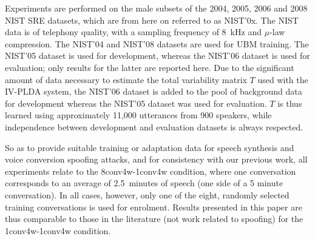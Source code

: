
Experiments are performed on the male subsets of the 2004, 2005, 2006 and 2008 NIST SRE datasets, which are from here on referred to as NIST'0x.  The NIST data is of telephony quality, with a sampling frequency of 8~kHz and $\mu$-law compression.
The NIST'04 and NIST'08 datasets are used for UBM training.
The NIST'05 dataset is used for development, whereas the NIST'06 dataset is used for evaluation;  
only results for the latter are reported here.
Due to the significant amount of data necessary to estimate the total variability matrix $T$ used with the IV-PLDA system, the NIST'06 dataset is added to the pool of background data for development whereas the NIST'05 dataset was used for evaluation. 
$T$ is thus learned using approximately 11,000 utterances from 900 speakers, while independence between development and evaluation datasets is always respected.
 
So as to provide suitable training or adaptation data for speech synthesis and voice conversion spoofing attacks, and for consistency with our previous work, all experiments relate to the 8conv4w-1conv4w condition, where one conversation corresponds to an average of 2.5~minutes of speech (one side of a 5 minute conversation).
In all cases, however, only one of the eight, randomly selected training conversations is used for enrolment. 
Results presented in this paper are thus comparable to those in the literature (not work related to spoofing) for the 1conv4w-1conv4w condition. 

